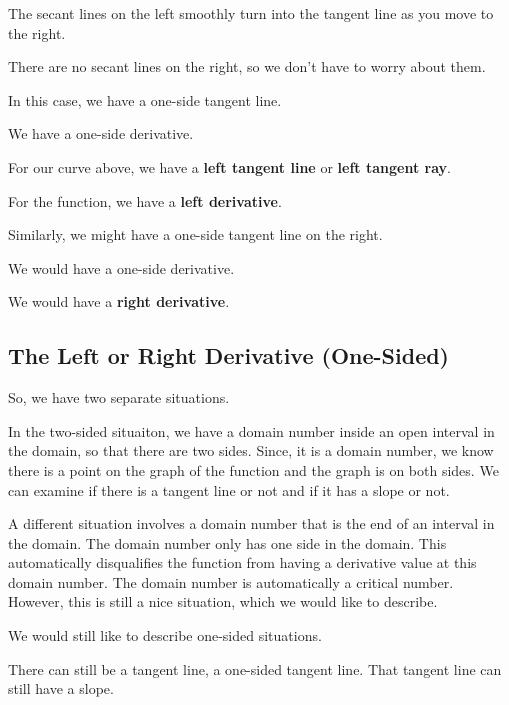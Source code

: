 \documentclass{ximera}
\begin{document}
The secant lines on the left smoothly turn into the tangent line as you move to the right. 


There are no secant lines on the right, so we don't have to worry about them. 





In this case, we have a one-side tangent line.  

We have a one-side derivative. 

For our curve above, we have a \textbf{left tangent line} or \textbf{left tangent ray}.

For the function, we have a \textbf{left derivative}.












Similarly, we might have a one-side tangent line on the right.  

We would have a one-side derivative. 


We would have a \textbf{right derivative}.






\subsection*{The Left or Right Derivative (One-Sided)}


So, we have two separate situations. 


In the two-sided situaiton, we have a domain number inside an open interval in the domain, so that there are two sides. Since, it is a domain number, we know there is a point on the graph of the function and the graph is on both sides.  We can examine if there is a tangent line or not and if it has a slope or not. 

A different situation involves a domain number that is the end of an interval in the domain.  The domain number only has one side in the domain.  This automatically disqualifies the function from having a derivative value at this domain number.  The domain number is automatically a critical number.  However, this is still a nice situation, which we would like to describe. 

We would still like to describe one-sided situations. 

There can still be a tangent line, a one-sided tangent line. That tangent line can still have a slope. 
\end{document}
